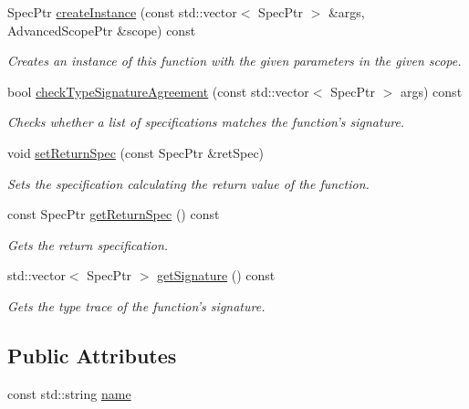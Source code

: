\begin{DoxyCompactItemize}
Spec\-Ptr \hyperlink{classgiskard__suturo_1_1FunctionDefinition_a0132a484566e94d573b180ae12d19093}{create\-Instance} (const std\-::vector$<$ Spec\-Ptr $>$ \&args, Advanced\-Scope\-Ptr \&scope) const 
\begin{DoxyCompactList}\small\item\em Creates an instance of this function with the given parameters in the given scope. \end{DoxyCompactList}\item 
bool \hyperlink{classgiskard__suturo_1_1FunctionDefinition_a26757c1eb352a7aa7c952dd8811dcafa}{check\-Type\-Signature\-Agreement} (const std\-::vector$<$ Spec\-Ptr $>$ args) const 
\begin{DoxyCompactList}\small\item\em Checks whether a list of specifications matches the function's signature. \end{DoxyCompactList}\item 
void \hyperlink{classgiskard__suturo_1_1FunctionDefinition_a788dcb5240b6de0f8a316c70a38be466}{set\-Return\-Spec} (const Spec\-Ptr \&ret\-Spec)
\begin{DoxyCompactList}\small\item\em Sets the specification calculating the return value of the function. \end{DoxyCompactList}\item 
const Spec\-Ptr \hyperlink{classgiskard__suturo_1_1FunctionDefinition_a71a224f73b1bc5357ef4ff225c06c9f8}{get\-Return\-Spec} () const 
\begin{DoxyCompactList}\small\item\em Gets the return specification. \end{DoxyCompactList}\item 
std\-::vector$<$ Spec\-Ptr $>$ \hyperlink{classgiskard__suturo_1_1FunctionDefinition_a688bf1ca593490e3881d97b1e7623f00}{get\-Signature} () const 
\begin{DoxyCompactList}\small\item\em Gets the type trace of the function's signature. \end{DoxyCompactList}\end{DoxyCompactItemize}
\subsection*{Public Attributes}
\begin{DoxyCompactItemize}
\item 
const std\-::string \hyperlink{classgiskard__suturo_1_1FunctionDefinition_ab482fb6e6a9e27255e398c834d1bc813}{name}
\end{DoxyCompactItemize}
